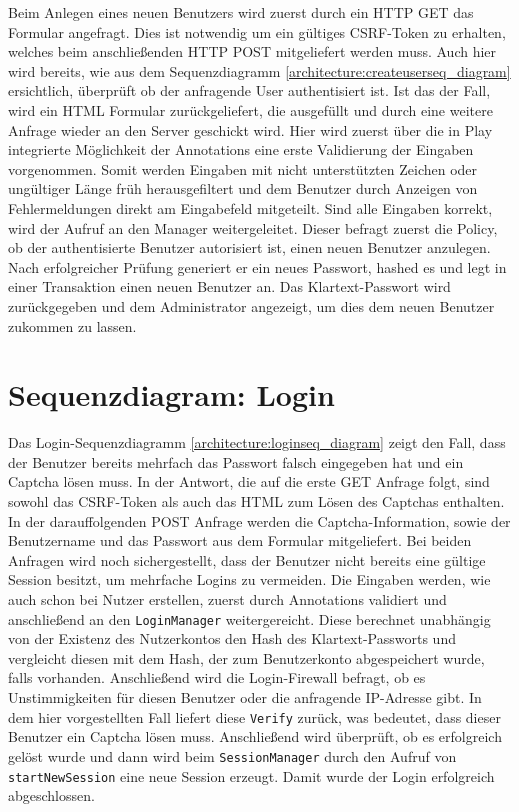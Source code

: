 \documentclass[12pt,DIV14,BCOR10mm,a4paper,parskip=half-,headsepline,headinclude,english,ngerman,bibliography=totocnumbered]{scrreprt}
\begin{document}
Beim Anlegen eines neuen Benutzers wird zuerst durch ein HTTP GET das Formular angefragt.
Dies ist notwendig um ein gültiges CSRF-Token zu erhalten, welches beim anschließenden HTTP POST mitgeliefert werden muss. Auch hier wird bereits, wie aus dem Sequenzdiagramm \ref{architecture:createuserseq_diagram} ersichtlich, überprüft ob der anfragende User authentisiert ist.
Ist das der Fall, wird ein HTML Formular zurückgeliefert, die ausgefüllt und durch eine weitere Anfrage wieder an den Server geschickt wird.
Hier wird zuerst über die in Play integrierte Möglichkeit der Annotations eine erste Validierung der Eingaben vorgenommen.
Somit werden Eingaben mit nicht unterstützten Zeichen oder ungültiger Länge früh herausgefiltert und dem Benutzer durch Anzeigen von Fehlermeldungen direkt am Eingabefeld mitgeteilt.
Sind alle Eingaben korrekt, wird der Aufruf an den Manager weitergeleitet.
Dieser befragt zuerst die Policy, ob der authentisierte Benutzer autorisiert ist, einen neuen Benutzer anzulegen.
Nach erfolgreicher Prüfung generiert er ein neues Passwort, hashed es und legt in einer Transaktion einen neuen Benutzer an.
Das Klartext-Passwort wird zurückgegeben und dem Administrator angezeigt, um dies dem neuen Benutzer zukommen zu lassen.

\section{Sequenzdiagram: Login}

Das Login-Sequenzdiagramm \ref{architecture:loginseq_diagram} zeigt den Fall, dass der Benutzer bereits mehrfach das Passwort falsch eingegeben hat und ein Captcha lösen muss. In der Antwort, die auf die erste GET Anfrage folgt, sind sowohl das CSRF-Token als auch das HTML zum Lösen des Captchas enthalten. In der darauffolgenden POST Anfrage werden die Captcha-Information, sowie der Benutzername und das Passwort aus dem Formular mitgeliefert. Bei beiden Anfragen wird noch sichergestellt, dass der Benutzer nicht bereits eine gültige Session besitzt, um mehrfache Logins zu vermeiden. Die Eingaben werden, wie auch schon bei Nutzer erstellen, zuerst durch Annotations validiert und anschließend an den \texttt{LoginManager} weitergereicht. Diese berechnet unabhängig von der Existenz des Nutzerkontos den Hash des Klartext-Passworts und vergleicht diesen mit dem Hash, der zum Benutzerkonto abgespeichert wurde, falls vorhanden. Anschließend wird die Login-Firewall befragt, ob es Unstimmigkeiten für diesen Benutzer oder die anfragende IP-Adresse gibt. In dem hier vorgestellten Fall liefert diese \texttt{Verify} zurück, was bedeutet, dass dieser Benutzer ein Captcha lösen muss. Anschließend wird überprüft, ob es erfolgreich gelöst wurde und dann wird beim \texttt{SessionManager} durch den Aufruf von \texttt{startNewSession} eine neue Session erzeugt. Damit wurde der Login erfolgreich abgeschlossen.
\end{document}
